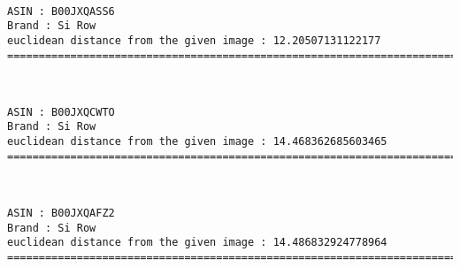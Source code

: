 \documentclass[11pt]{article}
\begin{document}
    \begin{center}
    \end{center}
    { \hspace*{\fill} \\}
    
    \begin{Verbatim}[commandchars=\\\{\}]
ASIN : B00JXQASS6
Brand : Si Row
euclidean distance from the given image : 12.20507131122177
=============================================================================================================================

    \end{Verbatim}

    \begin{center}
    \end{center}
    { \hspace*{\fill} \\}
    
    \begin{Verbatim}[commandchars=\\\{\}]
ASIN : B00JXQCWTO
Brand : Si Row
euclidean distance from the given image : 14.468362685603465
=============================================================================================================================

    \end{Verbatim}

    \begin{center}
    \end{center}
    { \hspace*{\fill} \\}
    
    \begin{Verbatim}[commandchars=\\\{\}]
ASIN : B00JXQAFZ2
Brand : Si Row
euclidean distance from the given image : 14.486832924778964
=============================================================================================================================

    \end{Verbatim}

    \begin{center}
    \end{center}
    { \hspace*{\fill} \\}
    
\end{document}
